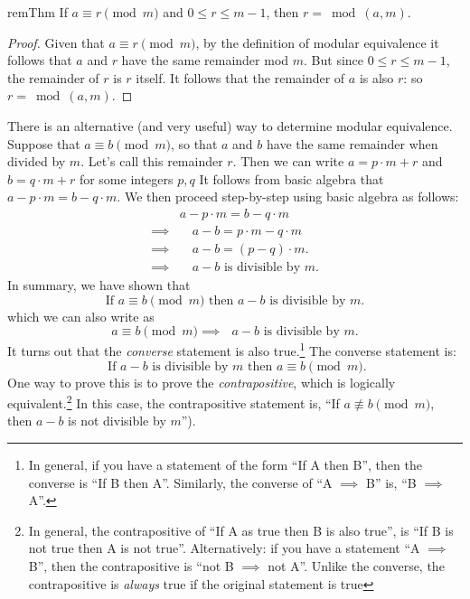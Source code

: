 \begin{prop}{remThm} If $a \equiv r \pmod{m}$ and $0 \le r \le m-1$, then $r = \bmod(a,m)$.
\end{prop}

\begin{proof}
Given that $a \equiv r \pmod{m}$, by the definition of modular equivalence it follows that $a$ and $r$ have the same remainder mod $m$.  But since $0 \le r \le m-1$, the remainder of $r$ is $r$ itself. It follows that the remainder of $a$ is also $r$: so $r = \bmod(a,m)$.
\end{proof}

There is an alternative (and very useful) way to determine modular equivalence.
Suppose that $a \equiv b \pmod{m}$, so that $a$ and $b$ have the same remainder when divided by $m$. Let's call this remainder $r$. Then we can write  $a = p \cdot m + r$ and $b = q \cdot m + r$ for some integers $p,q$ It follows from basic algebra that $a - p \cdot m =b - q \cdot m$. We then proceed step-by-step using basic algebra as follows:
\begin{align*}
&a - p \cdot m = b - q \cdot m \\
\implies &\quad a - b = p \cdot m - q \cdot m \\
\implies &\quad a - b = (p - q) \cdot m. \\
\implies &\quad a - b  \text{ is divisible by } m.
\end{align*}
In summary, we have shown that
\[\text{If } a \equiv b \pmod{m}  \text{ then } a - b \text{ is divisible by } m.\]
which we can also write as
\[a \equiv b \pmod{m} \implies \mbox{ $a - b$ is divisible by $m$.}\]
It turns out that the \emph{converse} statement is also true.\footnote{In general, if you have a statement of the form ``If A then B'', then the converse  is ``If B then A''.  Similarly, the converse of ``A $\implies$ B'' is, ``B $\implies$ A''.}  The converse statement is: 
\[\mbox{ If  $a - b$ is divisible by $m$  then }a \equiv b \pmod{m}. \]
One way to prove this is to prove the \emph{contrapositive},  which is logically equivalent.\footnote{In general, the contrapositive of ``If A as true then B is also true'',  is ``If B is not true then A is not true''.  Alternatively: if you have a statement ``A $\implies$ B'', then the contrapositive is ``not B $\implies$ not A''. Unlike the converse, the contrapositive is \emph{always} true if the original statement is true} In this case, the contrapositive statement is, ``If $a \not\equiv b \pmod{m}$, then $a-b$ is not divisible by $m$'').

